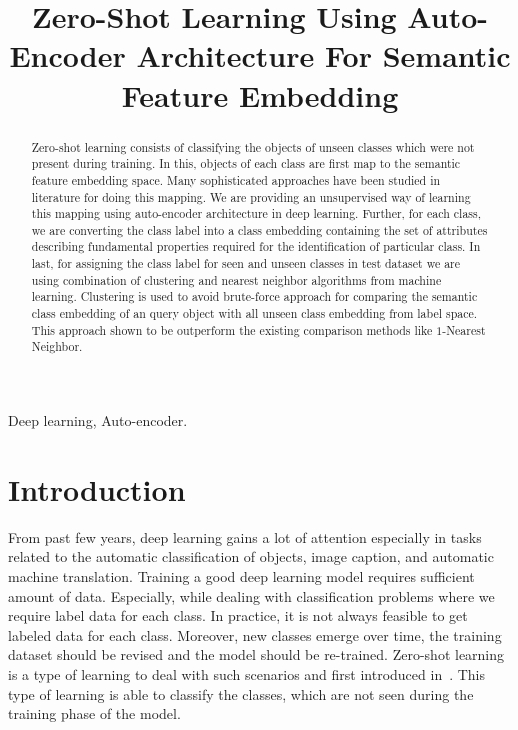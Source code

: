\documentclass[11pt, conference, english]{IEEEtran}
\title{Zero-Shot Learning Using Auto-Encoder Architecture For Semantic Feature Embedding}
\author{
	\IEEEauthorblockN{Sanidhay Bhambay, Anurag Gupta, Dinesh R}
	\IEEEauthorblockA{Samsung Electro-Mechanics Software India Bangalore Pvt Limited\\
		\{sanidhay.bhambay,anurag.gupta,dimesh.ramegowda\}@samsung.com}%
}
\theoremstyle{plain}
\theoremstyle{definition}
\theoremstyle{remark}
\begin{document}
{}

	\maketitle 
	\begin{abstract} 
		Zero-shot learning consists of classifying the objects of unseen classes which were not present during training. In this, objects of each class are first map to the semantic feature embedding space. Many sophisticated approaches have been studied in literature for doing this mapping. We are providing an unsupervised way of learning this mapping using auto-encoder architecture in deep learning. Further, for each class, we are converting the class label into a class embedding containing the set of attributes describing fundamental properties required for the identification of particular class. In last, for assigning the class label for seen and unseen classes in test dataset we are using combination of clustering and nearest neighbor algorithms from machine learning. Clustering is used to avoid brute-force approach for comparing the semantic class embedding of an query object with all unseen class embedding from label space. This approach shown to be outperform the existing comparison methods like $1$-Nearest Neighbor.
		
		
	\end{abstract}
	\begin{IEEEkeywords}
		Deep learning, Auto-encoder.
	\end{IEEEkeywords}
	\section{Introduction}
	From past few years, deep learning gains a lot of attention especially in tasks related to the automatic classification of objects, image caption, and automatic machine translation. Training a good deep learning model requires sufficient amount of data. Especially, while dealing with classification problems where we require label data for each class. In practice, it is not always feasible to get labeled data for each class. Moreover, new classes emerge over time, the training dataset should be revised and the model should be re-trained. Zero-shot learning is a type of learning to deal with such scenarios and first introduced in~\cite{palatucci2009zero}. This type of learning is able to classify the classes, which are not seen during the training phase of the model.
	
\end{document}
